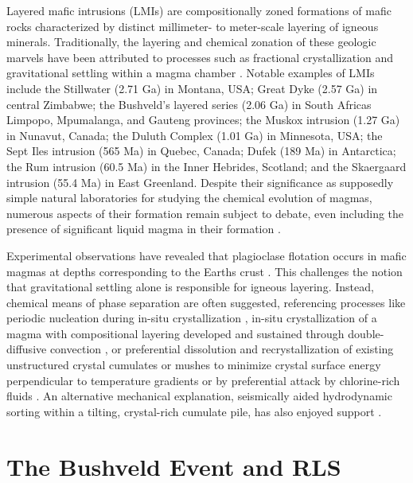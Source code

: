 Layered mafic intrusions (LMIs) are compositionally zoned formations of
mafic rocks characterized by distinct millimeter- to meter-scale layering
of igneous minerals. Traditionally, the layering and chemical zonation
of these geologic marvels have been attributed to processes such as
fractional crystallization and gravitational settling within a magma
chamber \citep{wager1960,charlier2015}. Notable examples of
LMIs include the Stillwater (2.71 Ga) in Montana, USA; Great Dyke (2.57
Ga) in central Zimbabwe; the Bushveld's layered series (2.06 Ga) in
South Africa\textquotesingle s Limpopo, Mpumalanga, and Gauteng
provinces; the Muskox intrusion (1.27 Ga) in Nunavut, Canada; the Duluth
Complex (1.01 Ga) in Minnesota, USA; the Sept Iles intrusion (565 Ma) in
Quebec, Canada; Dufek (189 Ma) in Antarctica; the Rum intrusion (60.5
Ma) in the Inner Hebrides, Scotland; and the Skaergaard intrusion (55.4
Ma) in East Greenland. Despite their significance as supposedly simple
natural laboratories for studying the chemical evolution of magmas,
numerous aspects of their formation remain subject to debate, even
including the presence of significant liquid magma in their formation
\citep{kruger2020,mungall2016,latypovetal2022,yaoetal2021}.

Experimental observations have revealed that plagioclase flotation
occurs in mafic magmas at depths corresponding to the
Earth\textquotesingle s crust \citep{campbell1978}. This challenges
the notion that gravitational settling alone is responsible for igneous
layering. Instead, chemical means of phase separation are often
suggested, referencing processes like periodic nucleation during in-situ
crystallization \citep{mcbirney1979}, in-situ crystallization of a
magma with compositional layering developed and sustained through
double-diffusive convection \citep{huppert1981}, or preferential
dissolution and recrystallization of existing unstructured crystal
cumulates or mushes to minimize crystal surface energy perpendicular to
temperature gradients \citep{boudreau2011} or by preferential attack by
chlorine-rich fluids \citep{sonnenthal1992}. An alternative mechanical
explanation, seismically aided hydrodynamic sorting within a
tilting, crystal-rich cumulate pile, has also enjoyed support \citep{maier2013}.

\section{The Bushveld Event and RLS}
\label{sec:ch5-the-bushveld-event-and-rls}

